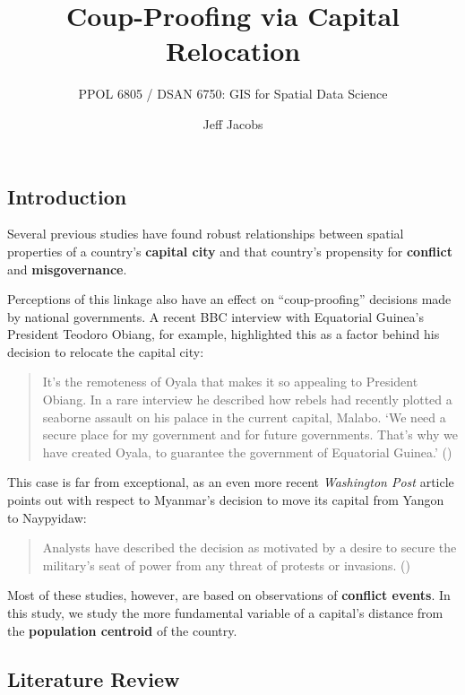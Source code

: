 \documentclass[
  letterpaper,
  DIV=11,
  numbers=noendperiod]{scrartcl}
\title{Coup-Proofing via Capital Relocation}
\subtitle{PPOL 6805 / DSAN 6750: GIS for Spatial Data Science}
\author{Jeff Jacobs}
\date{}
\begin{document}
\maketitle


\subsection{Introduction}\label{introduction}

Several previous studies have found robust relationships between spatial
properties of a country's \textbf{capital city} and that country's
propensity for \textbf{conflict} and \textbf{misgovernance}.

Perceptions of this linkage also have an effect on ``coup-proofing''
decisions made by national governments. A recent BBC interview with
Equatorial Guinea's President Teodoro Obiang, for example, highlighted
this as a factor behind his decision to relocate the capital city:

\begin{quote}
It's the remoteness of Oyala that makes it so appealing to President
Obiang. In a rare interview he described how rebels had recently plotted
a seaborne assault on his palace in the current capital, Malabo. `We
need a secure place for my government and for future governments. That's
why we have created Oyala, to guarantee the government of Equatorial
Guinea.' ()
\end{quote}

This case is far from exceptional, as an even more recent
\emph{Washington Post} article points out with respect to Myanmar's
decision to move its capital from Yangon to Naypyidaw:

\begin{quote}
Analysts have described the decision as motivated by a desire to secure
the military's seat of power from any threat of protests or invasions.
()
\end{quote}

Most of these studies, however, are based on observations of
\textbf{conflict events}. In this study, we study the more fundamental
variable of a capital's distance from the \textbf{population centroid}
of the country.

\subsection{Literature Review}\label{literature-review}
\end{document}
